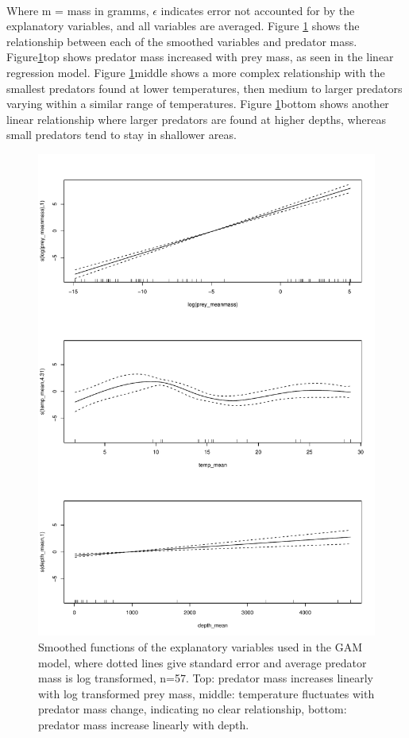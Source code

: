\documentclass[11pt,a4paper]{article}
\begin{document}
	\par \noindent ~\\ Where m = mass in gramms, $\epsilon$ indicates error not accounted for by the explanatory variables, and all variables are averaged. Figure \ref{fig:gammod} shows the relationship between each of the smoothed variables and predator mass. Figure\ref{fig:gammod}top shows predator mass increased with prey mass, as seen in the linear regression model. Figure \ref{fig:gammod}middle  shows a more complex relationship with the smallest predators found at lower temperatures, then medium to larger predators varying within a similar range of temperatures. Figure \ref{fig:gammod}bottom shows another linear relationship where larger predators are found at higher depths, whereas small predators tend to stay in shallower areas.
	 
	
	\begin{figure}[H]
		\centering %
		\includegraphics[width=0.8\linewidth]{../Results/gam_mod_plot.pdf}
		\caption{Smoothed functions of the explanatory variables used in the GAM model, where dotted lines give standard error and average predator mass is log transformed, n=57. Top: predator mass increases linearly with log transformed prey mass, middle: temperature fluctuates with predator mass change, indicating no clear relationship, bottom: predator mass increase linearly with depth.}
		\label{fig:gammod}
	\end{figure}	
\end{document}
